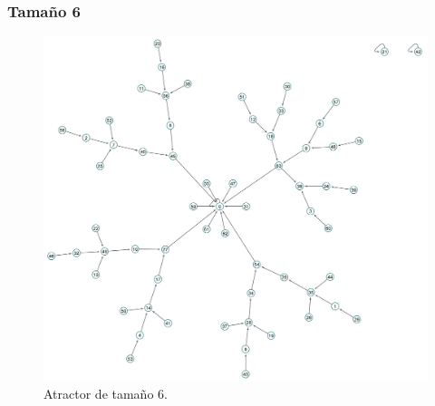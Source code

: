 \documentclass[11pt]{article}
\begin{document}
			\subsubsection{Tamaño 6}
			\begin{figure}[H]
			\centering
			\includegraphics[scale=0.1]{resources/Atractores22/atractor_22_size_6.png}
			\caption{Atractor de tamaño 6.}\label{fig:picture}
			\end{figure}
\end{document}
